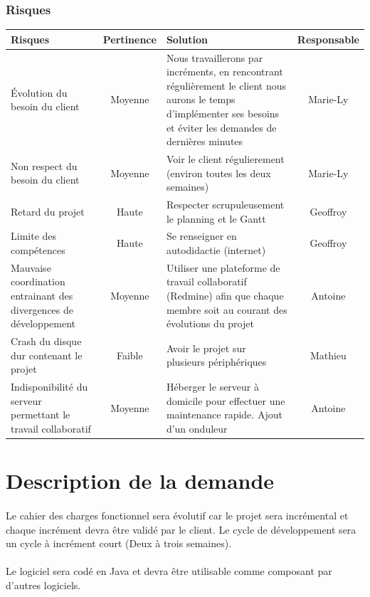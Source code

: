 \documentclass[12pt,a4paper,openany]{article}
\begin{document}
		\subsubsection{Risques}
		\begin{center}
		\begin{tabular}{|p{5.5cm}|c|p{6.5cm}|c|}
				\hline
				\textbf{Risques} & \textbf{Pertinence} & \textbf{Solution} & \textbf{Responsable} \\
				\hline
				Évolution du besoin du client & Moyenne &  Nous travaillerons par incréments, 
				en rencontrant régulièrement le client nous aurons le temps d'implémenter ses besoins et 
				éviter les demandes de dernières minutes & Marie-Ly \\ 
				\hline
				Non respect du besoin du client & Moyenne & Voir le client régulierement (environ toutes les deux semaines) & Marie-Ly\\ 
				\hline
				Retard du projet & Haute & Respecter scrupuleusement le planning et le Gantt & Geoffroy\\
				\hline
				Limite des compétences & Haute & Se renseigner en autodidactie (internet)& Geoffroy\\ 
				\hline
				Mauvaise coordination entrainant des divergences de développement& Moyenne & Utiliser une plateforme de travail collaboratif (Redmine) afin que
				chaque membre soit au courant des évolutions du projet & Antoine \\
				\hline
				Crash du disque dur contenant le projet & Faible& Avoir le projet sur plusieurs périphériques & Mathieu\\ \hline
				Indisponibilité du serveur permettant le travail collaboratif & Moyenne & Héberger le serveur à domicile pour effectuer une maintenance rapide.
				Ajout d'un onduleur & Antoine  \\
				\hline
			\end{tabular}
		\end{center}	
	\section{Description de la demande}
	\paragraph{}
		Le cahier des charges fonctionnel sera évolutif car le projet sera incrémental et chaque incrément devra 
		être validé par le client. Le cycle de développement sera un cycle à incrément court (Deux à trois semaines).
	\paragraph{}
		Le logiciel sera codé en Java et devra être utilisable comme composant par d'autres logiciels.\\
\end{document}
